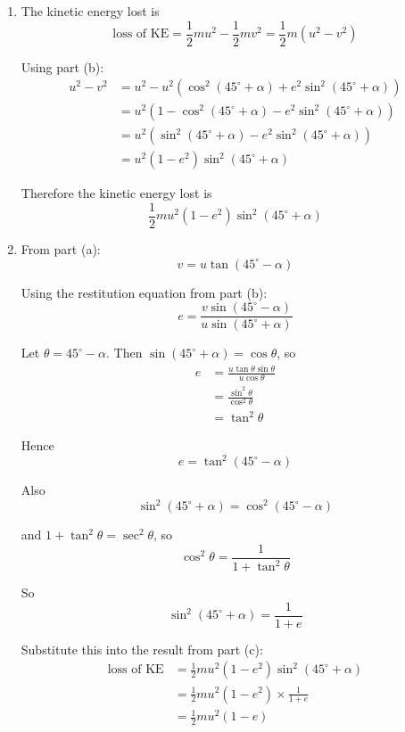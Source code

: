 \documentclass[leqno]{article}
\begin{document}
\begin{enumerate}[
  label=\textbf{\arabic*.},
  leftmargin=*,
  topsep=0pt,
  partopsep=0pt,
  parsep=0pt
]
\begin{djsSolution}
\begin{enumerate}[label=\textbf{(\alph*)}]
\item The kinetic energy lost is
\[
\text{loss of KE}=\frac12 mu^2-\frac12 mv^2=\frac12 m(u^2-v^2)
\]

Using part (b):
\begin{align*}
u^2-v^2
&=u^2-u^2\left(\cos^2(45^\circ+\alpha)+e^2\sin^2(45^\circ+\alpha)\right) \\
&=u^2\left(1-\cos^2(45^\circ+\alpha)-e^2\sin^2(45^\circ+\alpha)\right) \\
&=u^2\left(\sin^2(45^\circ+\alpha)-e^2\sin^2(45^\circ+\alpha)\right) \\
&=u^2(1-e^2)\sin^2(45^\circ+\alpha)
\end{align*}

Therefore the kinetic energy lost is
\[
\frac12 mu^2(1-e^2)\sin^2(45^\circ+\alpha)
\]

\item From part (a):
\[
v=u\tan(45^\circ-\alpha)
\]

Using the restitution equation from part (b):
\[
e=\frac{v\sin(45^\circ-\alpha)}{u\sin(45^\circ+\alpha)}
\]

Let \(\theta=45^\circ-\alpha\). Then \(\sin(45^\circ+\alpha)=\cos\theta\), so
\begin{align*}
e&=\frac{u\tan\theta\sin\theta}{u\cos\theta} \\
&=\frac{\sin^2\theta}{\cos^2\theta} \\
&=\tan^2\theta
\end{align*}

Hence
\[
e=\tan^2(45^\circ-\alpha)
\]

Also
\[
\sin^2(45^\circ+\alpha)=\cos^2(45^\circ-\alpha)
\]

and \(1+\tan^2\theta=\sec^2\theta\), so
\[
\cos^2\theta=\frac{1}{1+\tan^2\theta}
\]

So
\[
\sin^2(45^\circ+\alpha)=\frac{1}{1+e}
\]

Substitute this into the result from part (c):
\begin{align*}
\text{loss of KE}
&=\frac12 mu^2(1-e^2)\sin^2(45^\circ+\alpha) \\
&=\frac12 mu^2(1-e^2)\times \frac{1}{1+e} \\
&=\frac12 mu^2(1-e)
\end{align*}

\end{enumerate}
\end{djsSolution}


\newpage

\questionitem


\end{enumerate}
\end{document}
